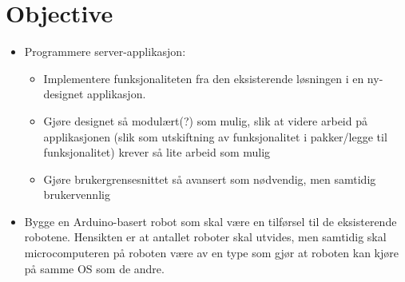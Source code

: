 \section{Objective}
\begin{itemize}
    \item Programmere server-applikasjon:
    \begin{itemize}
        \item Implementere funksjonaliteten fra den eksisterende løsningen i en ny-designet applikasjon.
        \item Gjøre designet så modulært(?) som mulig, slik at videre arbeid på applikasjonen (slik som utskiftning av funksjonalitet i pakker/legge til funksjonalitet) krever så lite arbeid som mulig
        \item Gjøre brukergrensesnittet så avansert som nødvendig, men samtidig brukervennlig
    \end{itemize}
    \item Bygge en Arduino-basert robot som skal være en tilførsel til de eksisterende robotene. Hensikten er at antallet roboter skal utvides, men samtidig skal microcomputeren på roboten være av en type som gjør at roboten kan kjøre på samme OS som de andre.
\end{itemize}